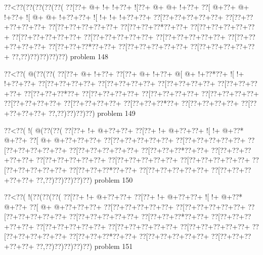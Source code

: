 \vbox{\vbox{\goo
\0??<\0??(\0??(\0??(\0??(\0??(
\0??[\0??+\- @+\- !+\- !+\0??+
\- ![\0??+\- @+\- @+\- !+\0??+
\0??[\- @+\0??+\- @+\- !+\0??+
\- ![\- @+\- @+\- !+\0??+\0??+
\- ![\- !+\- !+\- !+\0??+\0??+
\0??[\0??+\0??+\0??+\0??+\0??+
\0??[\0??+\0??+\0??+\0??+\0??+
\0??[\0??+\0??+\0??+\0??+\0??+
\0??[\0??+\0??+\0??*\0??+\0??+
\0??[\0??+\0??+\0??+\0??+\0??+
\0??[\0??+\0??+\0??+\0??+\0??+
\0??[\0??+\0??+\0??+\0??+\0??+
\0??[\0??+\0??+\0??+\0??+\0??+
\0??[\0??+\0??+\0??+\0??+\0??+
\0??[\0??+\0??+\0??*\0??+\0??+
\0??[\0??+\0??+\0??+\0??+\0??+
\0??[\0??+\0??+\0??+\0??+\0??+
\0??,\0??)\0??)\0??)\0??)\0??)
}
\hfil problem 148\hfil\break
}

\vbox{\vbox{\goo
\0??<\0??(\- @(\0??(\0??(
\0??[\0??+\- @+\- !+\0??+
\0??[\0??+\- @+\- !+\0??+
\- @[\- @+\- !+\0??*\0??+
\- ![\- !+\- !+\0??+\0??+
\0??[\0??+\0??+\0??+\0??+
\0??[\0??+\0??+\0??+\0??+
\0??[\0??+\0??+\0??+\0??+
\0??[\0??+\0??+\0??+\0??+
\0??[\0??+\0??+\0??*\0??+
\0??[\0??+\0??+\0??+\0??+
\0??[\0??+\0??+\0??+\0??+
\0??[\0??+\0??+\0??+\0??+
\0??[\0??+\0??+\0??+\0??+
\0??[\0??+\0??+\0??+\0??+
\0??[\0??+\0??+\0??*\0??+
\0??[\0??+\0??+\0??+\0??+
\0??[\0??+\0??+\0??+\0??+
\0??,\0??)\0??)\0??)\0??)
}
\hfil problem 149\hfil\break
}

\vbox{\vbox{\goo
\0??<\0??(\- !(\- @(\0??(\0??(
\0??[\0??+\- !+\- @+\0??+\0??+
\0??[\0??+\- !+\- @+\0??+\0??+
\- ![\- !+\- @+\0??*\- @+\0??+
\0??[\- @+\- @+\0??+\0??+\0??+
\0??[\0??+\0??+\0??+\0??+\0??+
\0??[\0??+\0??+\0??+\0??+\0??+
\0??[\0??+\0??+\0??+\0??+\0??+
\0??[\0??+\0??+\0??+\0??+\0??+
\0??[\0??+\0??+\0??*\0??+\0??+
\0??[\0??+\0??+\0??+\0??+\0??+
\0??[\0??+\0??+\0??+\0??+\0??+
\0??[\0??+\0??+\0??+\0??+\0??+
\0??[\0??+\0??+\0??+\0??+\0??+
\0??[\0??+\0??+\0??+\0??+\0??+
\0??[\0??+\0??+\0??*\0??+\0??+
\0??[\0??+\0??+\0??+\0??+\0??+
\0??[\0??+\0??+\0??+\0??+\0??+
\0??,\0??)\0??)\0??)\0??)\0??)
}
\hfil problem 150\hfil\break
}

\vbox{\vbox{\goo
\0??<\0??(\- !(\0??(\0??(\0??(
\0??[\0??+\- !+\- @+\0??+\0??+
\0??[\0??+\- !+\- @+\0??+\0??+
\- ![\- !+\- @+\0??*\- @+\0??+
\0??[\- @+\- @+\0??+\0??+\0??+
\0??[\0??+\0??+\0??+\0??+\0??+
\0??[\0??+\0??+\0??+\0??+\0??+
\0??[\0??+\0??+\0??+\0??+\0??+
\0??[\0??+\0??+\0??+\0??+\0??+
\0??[\0??+\0??+\0??*\0??+\0??+
\0??[\0??+\0??+\0??+\0??+\0??+
\0??[\0??+\0??+\0??+\0??+\0??+
\0??[\0??+\0??+\0??+\0??+\0??+
\0??[\0??+\0??+\0??+\0??+\0??+
\0??[\0??+\0??+\0??+\0??+\0??+
\0??[\0??+\0??+\0??*\0??+\0??+
\0??[\0??+\0??+\0??+\0??+\0??+
\0??[\0??+\0??+\0??+\0??+\0??+
\0??,\0??)\0??)\0??)\0??)\0??)
}
\hfil problem 151\hfil\break
}

